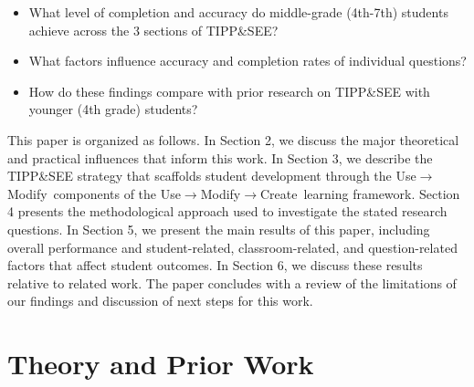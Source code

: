 \documentclass[sigconf,manuscript,review,anonymous]{acmart} %
\def\ts{TIPP\&SEE}
\def\umc{Use\begin{math}\rightarrow\end{math}Modify\begin{math}\rightarrow\end{math}Create\ }
\def\um{Use\begin{math}\rightarrow\end{math}Modify\ }
\begin{document}
\begin{itemize}
\item What level of completion and accuracy do middle-grade (4th-7th) students achieve across the 3 sections of \ts{}?
\item What factors influence accuracy and completion rates of individual questions?
\item How do these findings compare with prior research on \ts{} with younger (4th grade) students?
\end{itemize}
This paper is organized as follows. In Section 2, we discuss the major theoretical and practical influences that inform this work. In Section 3, we describe the \ts{} strategy that scaffolds student development through the \um components of the \umc learning framework. Section 4 presents the methodological approach used to investigate the stated research questions. In Section 5, we present the main results of this paper, including overall performance and student-related, classroom-related, and question-related factors that affect student outcomes. In Section 6, we discuss these results relative to related work. The paper concludes with a review of the limitations of our findings and discussion of next steps for this work.

\section{Theory and Prior Work}
\label{sec:background}
\thispagestyle{empty}
\end{document}
